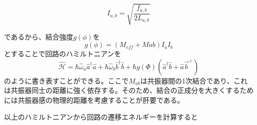 \begin{equation}
    I_{a,b} = \sqrt{\frac{f_{a,b}}{2 L_{a,b}}}
\end{equation}

であるから、結合強度$g(\phi)$を
\begin{equation}
    g(\phi) = (M_{eff}+M{ab})I_a I_b
\end{equation}
とすることで回路のハミルトニアンを
\begin{equation}
    \hat{\mathcal{H}} = \hbar \hat{\omega}_{a} \hat{a}^{\dagger} \hat{a}+\hbar \hat{\omega}_{b} \hat{b}^{\dagger} \hat{b}+\hbar g(\Phi)\left(\hat{a}^{\dagger}\hat{b}+\hat{a} \vec{b}^{+}\right)
\end{equation}
のように書き表すことができる。ここで$M_{ab}$は共振器間の1次結合であり、これは共振器同士の距離に強く依存する。そのため、結合の正成分を大きくするためには共振器感の物理的距離を考慮することが肝要である。

以上のハミルトニアンから回路の遷移エネルギーを計算すると

